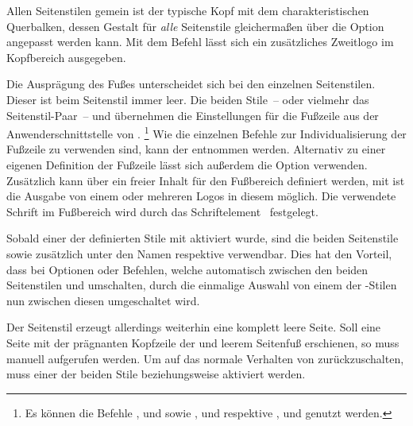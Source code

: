 \begin{Declaration*}{}
\begin{Declaration*}{}
\begin{Declaration*}{}
\begin{Declaration}[v2.02]{}
\begin{Declaration}[v2.02]{}
\begin{Declaration}[v2.02]{}
Allen Seitenstilen gemein ist der typische Kopf mit dem charakteristischen 
Querbalken, dessen Gestalt für \emph{alle} Seitenstile gleichermaßen über die 
Option  angepasst werden kann. Mit dem Befehl  
lässt sich ein zusätzliches Zweitlogo im Kopfbereich ausgegeben.

Die Ausprägung des Fußes unterscheidet sich bei den einzelnen Seitenstilen. 
Dieser ist beim Seitenstil  immer leer. Die beiden 
Stile~-- oder vielmehr das Seitenstil-Paar~--  und 
 übernehmen die Einstellungen für die Fußzeile aus 
der Anwenderschnittstelle von .%
\footnote{%
  Es können die Befehle ,  und  sowie 
  ,  und  respektive , 
   und  genutzt werden.
}
Wie die einzelnen Befehle zur Individualisierung der Fußzeile zu verwenden 
sind, kann der \scrguide[\KOMAScript"=Anleitung] entnommen werden. Alternativ 
zu einer eigenen Definition der Fußzeile lässt sich außerdem die Option 
 verwenden. Zusätzlich kann über  ein freier 
Inhalt für den Fußbereich definiert werden, mit  ist die 
Ausgabe von einem oder mehreren Logos in diesem möglich. Die verwendete Schrift 
im Fußbereich wird durch das Schriftelement~ festgelegt.

Sobald einer der definierten Stile mit  
aktiviert wurde, sind die beiden Seitenstile  sowie 
 zusätzlich unter den Namen  
respektive  verwendbar. Dies hat den Vorteil, dass bei 
Optionen oder Befehlen, welche automatisch zwischen den beiden Seitenstilen 
 und  umschalten, durch die einmalige 
Auswahl von einem der -Stilen nun zwischen diesen  
umgeschaltet wird.

Der Seitenstil  erzeugt allerdings weiterhin eine komplett 
leere Seite. Soll eine Seite mit der prägnanten Kopfzeile der \TnUD und leerem 
Seitenfuß erschienen, so muss  
manuell aufgerufen werden. Um auf das normale Verhalten von \KOMAScript{} 
zurückzuschalten, muss einer der beiden Stile  
beziehungsweise  aktiviert werden.
\end{Declaration}
\end{Declaration}
\end{Declaration}


\end{Declaration*}
\end{Declaration*}
\end{Declaration*}
